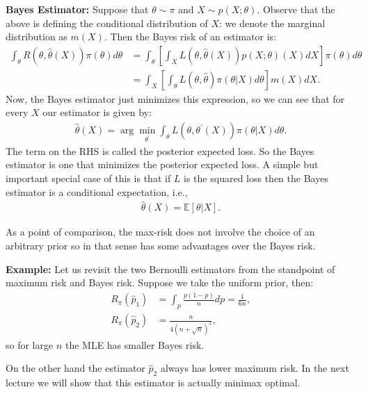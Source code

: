 \documentclass[twoside,12pt]{article}
\begin{document}
\begin{enumerate}
{\bf Bayes Estimator: } Suppose that $\theta \sim \pi$ and $X \sim p(X;\theta)$.
Observe that the above is defining the conditional distribution of $X$:
we denote the marginal distribution as $m(X)$. 
Then the Bayes risk
of an estimator is:
\begin{align*}
\int_{\theta} R(\theta, \widehat{\theta}(X)) \pi(\theta) d\theta &= \int_{\theta} \left[\int_{X}
L(\theta,\widehat{\theta}(X)) p(X;\theta)(X)  dX \right] \pi(\theta) d\theta \\
&= \int_X \left[ \int_{\theta} L(\theta,\widehat{\theta}) \pi(\theta | X)  d\theta \right] m(X) dX.
\end{align*}
Now, the Bayes estimator just minimizes this expression, so we can see that for every $X$
our estimator is given by:
\begin{align*}
\widehat{\theta}(X) = \arg \min_{\theta^{\prime}} \int_{\theta} L(\theta,\theta^{\prime}(X)) \pi (\theta | X) d\theta. 
\end{align*}
The term on the RHS is called the posterior expected loss. So the Bayes estimator is one that minimizes the posterior expected loss. A simple but important special case of this is that if
$L$ is the squared loss then the Bayes estimator is a conditional expectation, i.e., 
\begin{align*}
\widehat{\theta}(X) = \mathbb{E} [\theta | X].
\end{align*}

\end{enumerate}
As a point of comparison, the max-risk does not involve the choice of an arbitrary prior so in that sense has some advantages over the Bayes risk. 


{\bf Example: } Let us revisit the two Bernoulli estimators from the standpoint of maximum risk and 
Bayes risk. Suppose we take the uniform prior, then:
\begin{align*}
R_{\pi}(\widehat{p}_1)&= \int_p \frac{p(1-p)}{n} dp = \frac{1}{6n}, \\
R_{\pi}(\widehat{p}_2)&= \frac{n}{4(n + \sqrt{n})^2},
\end{align*}
so for large $n$ the MLE has smaller Bayes risk. 

On the other hand the estimator $\widehat{p}_2$ always has lower maximum risk.
In the next lecture we will show that this estimator is actually minimax optimal.
\end{document}

